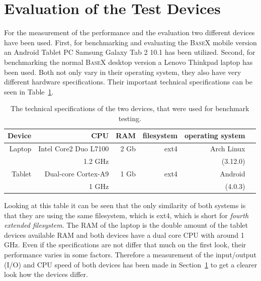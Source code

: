 \section{Evaluation of the Test Devices}
\label{sec:evaluation-of-the-test-devices}
For the measurement of the performance and the evaluation two different devices have been used.
First, for benchmarking and evaluating the \textsc{BaseX} mobile version an Android Tablet PC Samsung Galaxy Tab 2 10.1 has been utilized.
Second, for benchmarking the normal \textsc{BaseX} desktop version a Lenovo Thinkpad laptop has been used.
Both not only vary in their operating system, they also have very different hardware specifications.
Their important technical specifications can be seen in Table~\ref{tab:test-dev-specs}.
\begin {table}[htpb] 
  \centering
\begin {tabular} {|r|r|r|r|r|r|}
  	\hline
	Device&CPU&RAM&filesystem&operating system\\
	\hline
	Laptop&Intel Core2 Duo L7100&2 Gb&ext4&Arch Linux\\
	&1.2 GHz&&&(3.12.0)\\
	\hline
	Tablet&Dual-core Cortex-A9&1 Gb&ext4&Android\\
	&1 GHz&&&(4.0.3)\\
	\hline
\end {tabular}
\caption {The technical specifications of the two devices, that were used for benchmark testing.}
\label {tab:test-dev-specs}
\end {table}
\newpage
Looking at this table it can be seen that the only similarity of both systems is that they are using the same filesystem, which is ext4, which is short for \textit{fourth extended filesystem}.
The RAM of the laptop is the double amount of the tablet devices available RAM and both devices have a dual core CPU with around 1 GHz.
Even if the specifications are not differ that much on the first look, their performance varies in some factors.
Therefore a measurement of the input/output (I/O) and CPU speed of both devices has been made in Section~\ref{sec:evaluation-of-the-test-devices} to get a clearer look how the devices differ.


